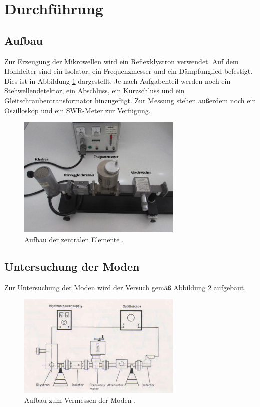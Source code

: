 \section{Durchführung}
\label{sec:Durchführung}

\subsection{Aufbau}
\label{subsec:aufbau}

Zur Erzeugung der Mikrowellen wird ein Reflexklystron verwendet. Auf dem Hohhleiter
sind ein Isolator, ein Frequenzmesser und ein Dämpfunglied befestigt. Dies ist
in Abbildung \ref{fig:aufbau} dargestellt. Je nach
Aufgabenteil werden noch ein Stehwellendetektor, ein Abschluss, ein Kurzschluss
und ein Gleitschraubentransformator hinzugefügt. Zur Messung stehen außerdem noch ein Oszilloskop
und ein SWR-Meter zur Verfügung.
\begin{figure}
  \centering
  \includegraphics[width=0.7\textwidth]{data/Aufbau.png}
  \caption{Aufbau der zentralen Elemente \cite{Versuchsanleitung_neu}.}
  \label{fig:aufbau}
\end{figure}


\subsection{Untersuchung der Moden}
\label{subsec:moden}
Zur Untersuchung der Moden wird der Versuch gemäß Abbildung \ref{fig:aufbau_mode}
aufgebaut.

\begin{figure}
  \centering
  \includegraphics[width=0.7\textwidth]{data/aufbau_mode.png}
  \caption{Aufbau zum Vermessen der Moden \cite{Versuchsanleitung_alt}.}
  \label{fig:aufbau_mode}
\end{figure}

